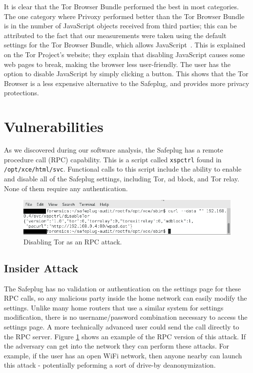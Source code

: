 \documentclass[letterpaper,twocolumn,10pt]{article}
\begin{document}
It is clear that the Tor Browser Bundle performed the best in most categories. The one category where Privoxy performed better than the Tor Browser Bundle is in the number of JavaScript objects received from third parties; this can be attributed to the fact that our measurements were taken using the default settings for the Tor Browser Bundle, which allows JavaScript~\cite{torproject}.  This is explained on the Tor Project's website; they explain that disabling JavaScript causes some web pages to break, making the browser less user-friendly.  The user has the option to disable JavaScript by simply clicking a button.  This shows that the Tor Browser is a less expensive alternative to the Safeplug, and provides more privacy protections.    

\section{Vulnerabilities}
As we discovered during our software analysis, the Safeplug has a remote procedure call (RPC) capability.  This is a script called \verb!xspctrl! found in \verb!/opt/xce/html/svc!.  Functional calls to this script include the ability to enable and disable all of the Safeplug settings, including Tor, ad block, and Tor relay.  None of them require any authentication.

\begin{figure}
  \centering
  \includegraphics[width=.5\textwidth]{disabletor2}
  \caption{Disabling Tor as an RPC attack.}
  \label{disable}
\end{figure}

\subsection{Insider Attack}
The Safeplug has no validation or authentication on the settings page for these RPC calls, so any malicious party inside the home network can easily modify the settings.  Unlike many home routers that use a similar system for settings modification, there is no username/password combination necessary to access the settings page.  A more technically advanced user could send the call directly to the RPC server.  Figure \ref{disable} shows an example of the RPC version of this attack.  If the adversary can get into the network they can perform these attacks.  For example, if the user has an open WiFi network, then anyone nearby can launch this attack - potentially peforming a sort of drive-by deanonymization. 
\end{document}
